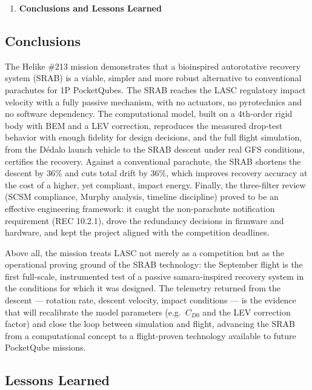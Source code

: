 \begin{enumerate}
\def\labelenumi{\arabic{enumi}.}
\setcounter{enumi}{4}
\item
  \textbf{Conclusions and Lessons Learned}
\end{enumerate}

\subsection{Conclusions}

The Helike \#213 mission demonstrates that a bioinspired autorotative
recovery system (SRAB) is a viable, simpler and more robust
alternative to conventional parachutes for 1P PocketQubes. The SRAB
reaches the LASC regulatory impact velocity with a fully passive
mechanism, with no actuators, no pyrotechnics and no software
dependency. The computational model, built on a 4th-order rigid body
with BEM and a LEV correction, reproduces the measured drop-test
behavior with enough fidelity for design decisions, and the full
flight simulation, from the Dédalo launch vehicle to the SRAB descent
under real GFS conditions, certifies the recovery. Against a
conventional parachute, the SRAB shortens the descent by 36\% and cuts
total drift by 36\%, which improves recovery accuracy at the cost of a
higher, yet compliant, impact energy. Finally, the three-filter review
(SCSM compliance, Murphy analysis, timeline discipline) proved to be
an effective engineering framework: it caught the non-parachute
notification requirement (REC 10.2.1), drove the redundancy decisions
in firmware and hardware, and kept the project aligned with the
competition deadlines.

Above all, the mission treats LASC not merely as a competition but as
the operational proving ground of the SRAB technology: the September
flight is the first full-scale, instrumented test of a passive
samara-inspired recovery system in the conditions for which it was
designed. The telemetry returned from the descent --- rotation rate,
descent velocity, impact conditions --- is the evidence that will
recalibrate the model parameters (e.g.\ $C_{D0}$ and the LEV
correction factor) and close the loop between simulation and flight,
advancing the SRAB from a computational concept to a flight-proven
technology available to future PocketQube missions.

\subsection{Lessons Learned}

